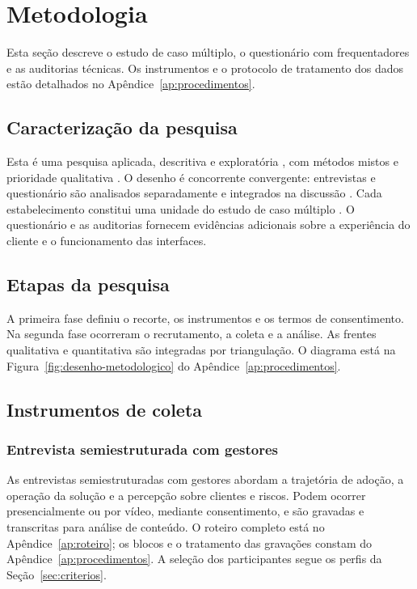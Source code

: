 \chapter{Metodologia}
\label{ch:metodologia}

Esta seção descreve o estudo de caso múltiplo, o questionário com frequentadores e as auditorias técnicas. Os instrumentos e o protocolo de tratamento dos dados estão detalhados no Apêndice~\ref{ap:procedimentos}.

\section{Caracterização da pesquisa}
\label{sec:caracterizacao}

Esta é uma pesquisa aplicada, descritiva e exploratória \cite{gil2017projetos}, com métodos mistos e prioridade qualitativa \cite{venkatesh2013bridging}. O desenho é concorrente convergente: entrevistas e questionário são analisados separadamente e integrados na discussão \cite{creswell2017mixed}. Cada estabelecimento constitui uma unidade do estudo de caso múltiplo \cite{yin2015estudo}. O questionário e as auditorias fornecem evidências adicionais sobre a experiência do cliente e o funcionamento das interfaces.

\section{Etapas da pesquisa}
\label{sec:etapas}

A primeira fase definiu o recorte, os instrumentos e os termos de consentimento. Na segunda fase ocorreram o recrutamento, a coleta e a análise. As frentes qualitativa e quantitativa são integradas por triangulação. O diagrama está na Figura~\ref{fig:desenho-metodologico} do Apêndice~\ref{ap:procedimentos}.

\section{Instrumentos de coleta}
\label{sec:instrumentos}

\subsection{Entrevista semiestruturada com gestores}
\label{sec:entrevista}

As entrevistas semiestruturadas com gestores abordam a trajetória de adoção, a operação da solução e a percepção sobre clientes e riscos. Podem ocorrer presencialmente ou por vídeo, mediante consentimento, e são gravadas e transcritas para análise de conteúdo. O roteiro completo está no Apêndice~\ref{ap:roteiro}; os blocos e o tratamento das gravações constam do Apêndice~\ref{ap:procedimentos}. A seleção dos participantes segue os perfis da Seção~\ref{sec:criterios}.

